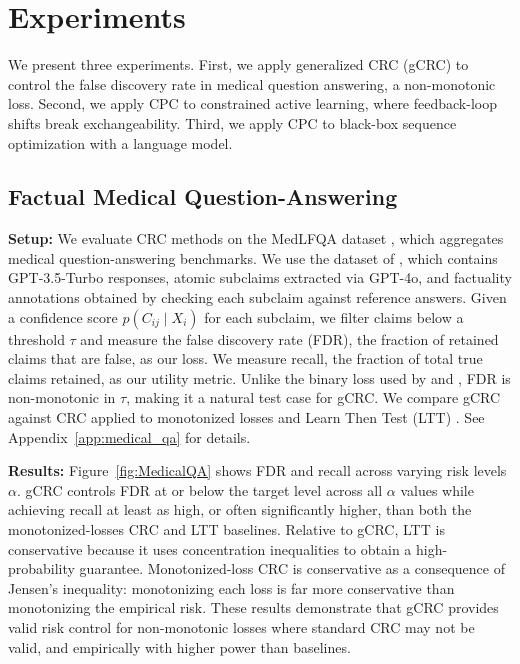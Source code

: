 \section{Experiments}



We present three experiments. First, we apply generalized CRC (gCRC) to control the false discovery rate in medical question answering, a non-monotonic loss. Second, we apply CPC to constrained active learning, where feedback-loop shifts break exchangeability. Third, we apply CPC to black-box sequence optimization with a language model.

\subsection{Factual Medical Question-Answering}

\textbf{Setup:} We evaluate CRC methods on the MedLFQA dataset \citep{jeong2024olaph}, which aggregates medical question-answering benchmarks. 
We use the dataset of \citet{cherian2024large}, which contains GPT-3.5-Turbo responses, atomic subclaims extracted via GPT-4o, and factuality annotations obtained by checking each subclaim against reference answers. 
Given a confidence score $p(C_{ij} \mid X_i)$ for each subclaim, we filter claims below a threshold $\tau$ and measure the false discovery rate (FDR), the fraction of retained claims that are false, as our loss. 
We measure recall, the fraction of total true claims retained, as our utility metric. Unlike the binary loss used by \citet{mohri2024language} and \citet{cherian2024large}, FDR is non-monotonic in $\tau$, making it a natural test case for gCRC. We compare gCRC against CRC applied to monotonized losses and Learn Then Test (LTT) \citep{angelopoulos2021learn}. See Appendix~\ref{app:medical_qa} for details.

\textbf{Results:} Figure~\ref{fig:MedicalQA} shows FDR and recall across varying risk levels $\alpha$. gCRC controls FDR at or below the target level across all $\alpha$ values while achieving recall at least as high, or often significantly higher, than both the monotonized-losses CRC and LTT baselines. 
Relative to gCRC, LTT is conservative because it uses concentration inequalities to obtain a high-probability guarantee. Monotonized-loss CRC is conservative as a consequence of Jensen's inequality: monotonizing each loss is far more conservative than monotonizing the empirical risk.
These results demonstrate that gCRC provides valid risk control for non-monotonic losses where standard CRC may not be valid, and empirically with higher power than baselines.


